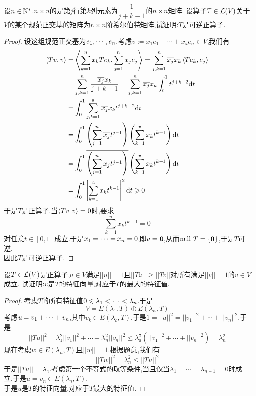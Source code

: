 \documentclass{ctexart}
\begin{document}
\begin{problem}[21.]
    设$n\in\mathbb{N}^*$.$n\times n$的是第$j$行第$k$列元素为$\dfrac{1}{j+k-1}$的$n\times n$矩阵.%
    设算子$T\in\mathcal{L}(V)$关于$V$的某个规范正交基的矩阵为$n\times n$阶希尔伯特矩阵,试证明:$T$是可逆正算子.
\end{problem}
\begin{proof}
    设这组规范正交基为${e}_1,\cdots,{e}_{n}$.考虑$v:=x_1e_1+\cdots+x_ne_n\in V$,我们有
    \[\begin{aligned}
        \left\langle{Tv},{v}\right\rangle
        &= \left\langle{\sum_{k=1}^{n}x_kTe_k},{\sum_{j=1}^{n}x_je_j}\right\rangle 
        = \sum_{j,k=1}^{n}\overline{x_j}x_k\left\langle{Te_k},{e_j}\right\rangle \\
        &= \sum_{j,k=1}^{n}\dfrac{\overline{x_j}x_k}{j+k-1} 
        = \sum_{j,k=1}^{n}\overline{x_j}x_k\int_{0}^{1}t^{j+k-2}\mathrm{d} t \\
        &= \int_0^1\sum_{j,k=1}^{n}\overline{x_j}x_kt^{j+k-2}\mathrm{d} t \\
        &= \int_0^1\left(\sum_{j=1}^{n}\overline{x_j}t^{j-1}\right)\left(\sum_{k=1}^{n}x_kt^{k-1}\right)\mathrm{d} t \\
        &= \int_0^1\overline{\left(\sum_{j=1}^nx_jt^{j-1}\right)}\left(\sum_{k=1}^{n}x_kt^{k-1}\right)\mathrm{d} t \\
        &= \int_0^1\left|\sum_{k=1}^{n}x_kt^{k-1}\right|^2\mathrm{d} t
        \geqslant0
    \end{aligned}\]
    于是$T$是正算子.当$\left\langle{Tv},{v}\right\rangle=0$时,要求
    \[\sum_{k=1}^{n}x_kt^{k-1}=0\]
    对任意$t\in[0,1]$成立.于是${x}_1=\cdots={x}_{n}=0$,即$v=\mathbf0$,从而$\text{null } T=\{\mathbf0\}$,于是$T$可逆.\\
    因此$T$是可逆正算子.
\end{proof}
\begin{problem}[22.]
    设$T\in\mathcal{L}(V)$是正算子,$u\in V$满足$||u||=1$且$||Tu||\geqslant||Tv||$对所有满足$||v||=1$的$v\in V$成立.%
    试证明:$u$是$T$的特征向量,对应于$T$的最大的特征值.
\end{problem}
\begin{proof}
    考虑$T$的所有特征值$0\leqslant{\lambda}_1<\cdots<{\lambda}_{n}$.于是
    \[V=E(\lambda_1,T)\oplus E(\lambda_n,T)\]
    考虑$u={v}_1+\cdots+{v}_{n}$,其中$v_k\in E(\lambda_k,T)$.于是$1=||u||^2=||v_1||^2+\cdots+||v_n||^2$.于是
    \[||Tu||^2=\lambda_1^2||v_1||^2+\cdots+\lambda_n^2||v_n||^2\leqslant\lambda_n^2\left(||v_1||^2+\cdots+||v_n||^2\right)=\lambda_n^2\]
    现在考虑$w\in E(\lambda_n,T)$且$||w||=1$.根据题意,我们有
    \[||Tw||^2=\lambda_n^2\leqslant||Tu||^2\]
    于是$||Tu||=\lambda_n$.考虑第一个不等式的取等条件,当且仅当$\lambda_1=\cdots=\lambda_{n-1}=0$时成立,于是$u=v_n\in E(\lambda_n,T)$.\\
    于是$u$是$T$的特征向量,对应于$T$最大的特征值.
\end{proof}
\end{document}
